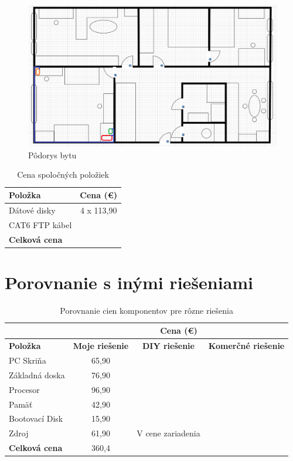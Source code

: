 \documentclass[12pt,oneside,slovak,a4paper]{article}
\begin{document}
\begin{figure}[H]
	\centering
	\captionsetup{justification=centering,margin=2cm}
	\includegraphics[width=\linewidth]{./images/nakres-bytu.png}
	\centering
	\caption{Pôdorys bytu}
	\label{fig:floorplan}
\end{figure}


\begin{table}[h]
\centering
\begin{tabular}{|l|c|}
\hline
\textbf{Položka} & \textbf{Cena (€)} \\ \hline
Dátové disky & 4 x 113,90 \\ \hline
CAT6 FTP kábel &  \\ \hline

\textbf{Celková cena} &  \\ \hline
\end{tabular}
\caption{Cena spoločných položiek}
\end{table}

\section{Porovnanie s inými riešeniami}
\begin{table}[h]
\centering
\begin{tabular}{|l|c|c|c|}
\hline & \multicolumn{3}{c|}{\textbf{Cena (€)}} \\ \hline
\textbf{Položka} & \textbf{Moje riešenie} & \textbf{DIY riešenie} & \textbf{Komerčné riešenie} \\ \hline
PC Skriňa & 65,90 &  &  \\ \hline
Základná doska & 76,90 &  &  \\ \hline
Procesor & 96,90 &  &  \\ \hline
Pamäť & 42,90 &  &  \\ \hline
Bootovací Disk & 15,90 &  &  \\ \hline
Zdroj & 61,90 & V cene zariadenia &  \\ \hline
\textbf{Celková cena} & 360,4 &  &  \\ \hline
\end{tabular}
\caption{Porovnanie cien komponentov pre rôzne riešenia}
\end{table}
\end{document}
